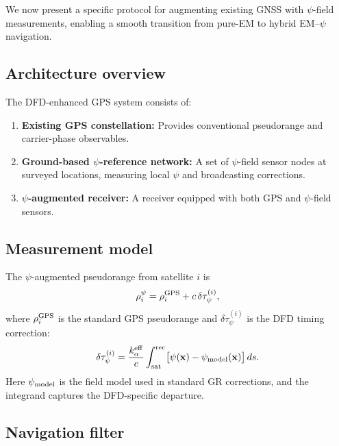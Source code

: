\documentclass[aps,prd,twocolumn,superscriptaddress,nofootinbib]{revtex4-2}
\begin{document}
We now present a specific protocol for augmenting existing GNSS
with $\psi$-field measurements, enabling a smooth transition from
pure-EM to hybrid EM--$\psi$ navigation.

\subsection{Architecture overview}\label{sec:arch}

The DFD-enhanced GPS system consists of:
\begin{enumerate}
\item \textbf{Existing GPS constellation:} Provides conventional
pseudorange and carrier-phase observables.
\item \textbf{Ground-based $\psi$-reference network:} A set of
$\psi$-field sensor nodes at surveyed locations, measuring local
$\psi$ and broadcasting corrections.
\item \textbf{$\psi$-augmented receiver:} A receiver equipped with
both GPS and $\psi$-field sensors.
\end{enumerate}

\subsection{Measurement model}\label{sec:meas-model}

The $\psi$-augmented pseudorange from satellite $i$ is
\begin{equation}\label{eq:augmented-PR}
\rho_i^{\psi} = \rho_i^{\rm GPS} + c\,\delta\tau_\psi^{(i)},
\end{equation}
where $\rho_i^{\rm GPS}$ is the standard GPS pseudorange and
$\delta\tau_\psi^{(i)}$ is the DFD timing correction:
\begin{equation}\label{eq:DFD-correction}
\delta\tau_\psi^{(i)} = \frac{k_\alpha^{\rm eff}}{c}\int_{\rm sat}^{\rm rec}
\bigl[\psi(\mathbf{x}) - \psi_{\rm model}(\mathbf{x})\bigr]\,ds.
\end{equation}
Here $\psi_{\rm model}$ is the field model used in standard GR
corrections, and the integrand captures the DFD-specific departure.

\subsection{Navigation filter}\label{sec:nav-filter}
\end{document}
